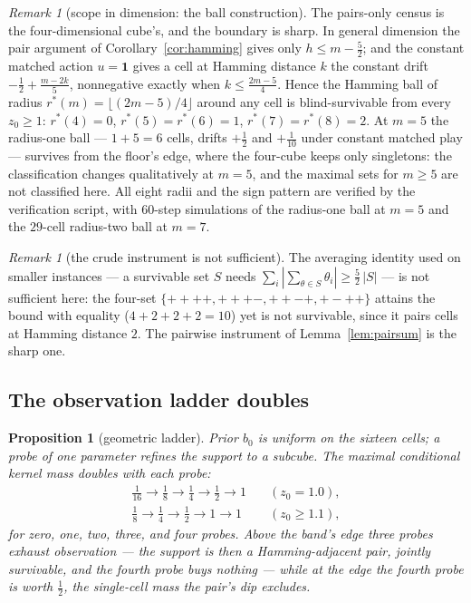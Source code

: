 \documentclass[10pt,twocolumn]{article}
\theoremstyle{plain}
\newtheorem{proposition}[theorem]{Proposition}
\theoremstyle{definition}
\theoremstyle{remark}
\newtheorem{remark}[theorem]{Remark}
\begin{document}
\begin{remark}[scope in dimension: the ball construction]
\label{rem:scope}
The pairs-only census is the four-dimensional cube's, and the boundary
is sharp. In general dimension the pair argument of
Corollary~\ref{cor:hamming} gives only \(h \le m - \tfrac52\); and
the constant matched action \(u = \mathbf{1}\) gives a cell at
Hamming distance \(k\) the constant drift
\(-\tfrac12 + \tfrac{m - 2k}{5}\), nonnegative exactly when
\(k \le \tfrac{2m-5}{4}\). Hence the Hamming ball of radius
\(r^{*}(m) = \lfloor (2m - 5)/4 \rfloor\) around any cell is
blind-survivable from every \(z_{0} \ge 1\):
\(r^{*}(4) = 0\), \(r^{*}(5) = r^{*}(6) = 1\),
\(r^{*}(7) = r^{*}(8) = 2\). At \(m = 5\) the radius-one ball ---
\(1 + 5 = 6\) cells, drifts \(+\tfrac12\) and \(+\tfrac1{10}\)
under constant matched play --- survives from the floor's edge, where
the four-cube keeps only singletons: the classification changes
qualitatively at \(m = 5\), and the maximal sets for \(m \ge 5\)
are not classified here. All eight radii and the sign pattern are
verified by the verification script, with \(60\)-step simulations of the
radius-one ball at \(m = 5\) and the \(29\)-cell radius-two ball at
\(m = 7\).
\end{remark}

\begin{remark}[the crude instrument is not sufficient]
\label{rem:crude}
The averaging identity used on smaller instances --- a survivable set
\(S\) needs \(\sum_{i} |\sum_{\theta \in S} \theta_{i}| \ge
\tfrac52\,|S|\) --- is not sufficient here: the four-set
\(\{++++, +++-, ++-+, +-++\}\) attains the bound with equality
(\(4 + 2 + 2 + 2 = 10\)) yet is not survivable, since it pairs cells
at Hamming distance \(2\). The pairwise instrument of
Lemma~\ref{lem:pairsum} is the sharp one.
\end{remark}

\subsection{The observation ladder doubles}\label{ladder}

\begin{proposition}[geometric ladder]\label{prop:ladder}
Prior \(b_{0}\) is uniform on the sixteen cells; a probe of one
parameter refines the support to a subcube. The maximal conditional
kernel mass doubles with each probe:
\begin{align*}
\tfrac1{16} \to \tfrac18 \to \tfrac14 \to \tfrac12 \to 1
&\quad (z_{0} = 1.0),\\
\tfrac18 \to \tfrac14 \to \tfrac12 \to 1 \to 1
&\quad (z_{0} \ge 1.1),
\end{align*}
for zero, one, two, three, and four probes. Above the band's edge
three probes exhaust observation --- the support is then a
Hamming-adjacent pair, jointly survivable, and the fourth probe buys
nothing --- while at the edge the fourth probe is worth
\(\tfrac12\), the single-cell mass the pair's dip excludes.
\end{proposition}
\end{document}

